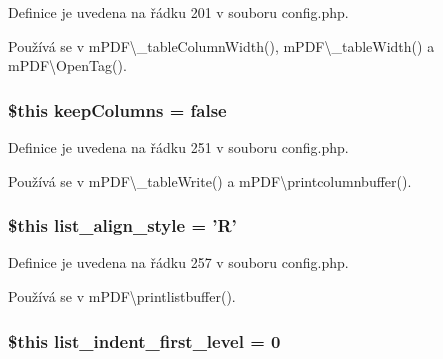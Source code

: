 Definice je uvedena na řádku 201 v souboru config.\-php.



Používá se v m\-P\-D\-F\textbackslash{}\-\_\-table\-Column\-Width(), m\-P\-D\-F\textbackslash{}\-\_\-table\-Width() a m\-P\-D\-F\textbackslash{}\-Open\-Tag().

\hypertarget{config_8php_aee7c7fc30389606b37f82320b90ee518}{
\subsubsection[{keep\-Columns}]{\setlength{\rightskip}{0pt plus 5cm}\$this keep\-Columns = {\bf false}}}\label{config_8php_aee7c7fc30389606b37f82320b90ee518}


Definice je uvedena na řádku 251 v souboru config.\-php.



Používá se v m\-P\-D\-F\textbackslash{}\-\_\-table\-Write() a m\-P\-D\-F\textbackslash{}printcolumnbuffer().

\hypertarget{config_8php_ac1485101227c51b6c239bc7a6181b27c}{
\subsubsection[{list\-\_\-align\-\_\-style}]{\setlength{\rightskip}{0pt plus 5cm}\$this list\-\_\-align\-\_\-style = 'R'}}\label{config_8php_ac1485101227c51b6c239bc7a6181b27c}


Definice je uvedena na řádku 257 v souboru config.\-php.



Používá se v m\-P\-D\-F\textbackslash{}printlistbuffer().

\hypertarget{config_8php_a41fb70fe30e7c6d2f58596cc1cf663c7}{
\subsubsection[{list\-\_\-indent\-\_\-first\-\_\-level}]{\setlength{\rightskip}{0pt plus 5cm}\$this list\-\_\-indent\-\_\-first\-\_\-level = 0}}\label{config_8php_a41fb70fe30e7c6d2f58596cc1cf663c7}


